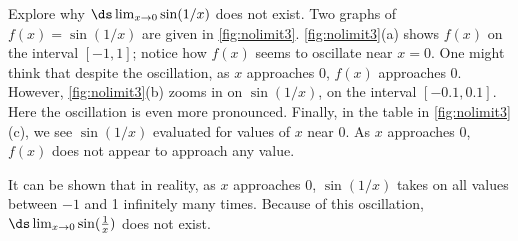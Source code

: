 \begin{example}\label{ex_no_limit3}%
Explore why $\ds\lim_{x\to 0}\sin(1/x)$ does not exist.
\solution
Two graphs of $f(x) = \sin(1/x)$ are given in \autoref{fig:nolimit3}. \autoref{fig:nolimit3}(a) shows $f(x)$ on the interval $[-1,1]$; notice how $f(x)$ seems to oscillate near $x=0$. One might think that despite the oscillation, as $x$ approaches 0, $f(x)$ approaches 0. However, \autoref{fig:nolimit3}(b) zooms in on $\sin(1/x)$, on the interval $[-0.1,0.1]$. Here the oscillation is even more pronounced. Finally, in the table in \autoref{fig:nolimit3}(c), we see $\sin(1/x)$ evaluated for values of $x$ near 0. As $x$ approaches 0, $f(x)$ does not appear to approach any value. 

It can be shown that in reality, as $x$ approaches 0, $\sin(1/x)$ takes on all values between $-1$ and 1 infinitely many times. Because of this oscillation,
$\ds\lim_{x\to 0}\sin(\frac1x)$ does not exist.
\end{example}

